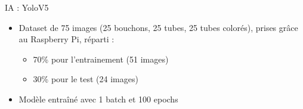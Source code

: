 \begin{frame}[allowframebreaks]{IA : YoloV5}
            \begin{block}{}
                \begin{itemize}
                    [square]
                    \item Dataset de 75 images (25 bouchons, 25 tubes, 25 tubes colorés), prises grâce au Raspberry Pi, réparti :
                        \begin{itemize}
                            \item 70\% pour l'entrainement (51 images)
                            \item 30\% pour le test (24 images)
                        \end{itemize}
                    \item Modèle entraîné avec 1 batch et 100 epochs
                \end{itemize}
            \end{block}
            

\end{frame}
